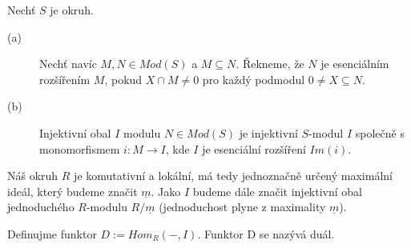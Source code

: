      \begin{dfn}
       Nechť $S$ je okruh.
       \begin{description}
         \item[(a)] Nechť  navíc $M,N\in Mod(S)$ a $M\subseteq N$. Řekneme, že $N$ je esenciálním rozšířením 
         $M$, pokud $X\cap M\neq0$ pro každý podmodul $0\neq X\subseteq N$. 
         \item[(b)] Injektivní obal $I$ modulu $N\in Mod(S)$ je injektivní $S$-modul $I$ společně s 
         monomorfismem $i:M\rightarrow I$, kde $I$ je esenciální rozšíření $Im(i)$. 
       \end{description}
     \end{dfn}
     
     Náš okruh $R$ je komutativní a lokální, má tedy jednoznačně určený maximální ideál, který 
     budeme značit $\underline{m}$. 
     Jako $I$ budeme dále značit injektivní obal 
     jednoduchého $R$-modulu $R/\underline{m}$ (jednoduchost plyne z maximality $\underline{m}$).
     
     \begin{dfn}
       Definujme funktor $D:=Hom_R(-,I)$. Funktor D se nazývá duál.
     \end{dfn}
     
